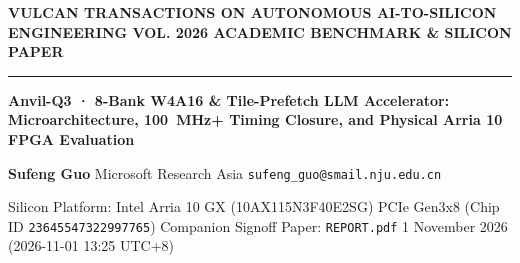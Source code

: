 \documentclass[11pt,a4paper]{article}
\begin{document}
{\scriptsize\sffamily\textcolor{vulcan}{\textbf{VULCAN TRANSACTIONS ON AUTONOMOUS AI-TO-SILICON ENGINEERING \hfill VOL. 2026 \textperiodcentered{} ACADEMIC BENCHMARK \& SILICON PAPER}}\par}

\vspace{1pt}\textcolor{vulcan}{\rule{\textwidth}{1.2pt}}\vspace{3pt}

\begin{center}

{\sffamily\LARGE\bfseries Anvil-Q3 · 8-Bank W4A16 \& Tile-Prefetch LLM Accelerator: Microarchitecture, 100~MHz+ Timing Closure, and Physical Arria 10 FPGA Evaluation\par}\vspace{3pt}

{\small\sffamily\textbf{Sufeng Guo} \textperiodcentered{} Microsoft Research Asia \textperiodcentered{} \texttt{sufeng\_guo@smail.nju.edu.cn}\par}\vspace{1pt}

{\scriptsize\sffamily\textcolor{black!75}{Silicon Platform: Intel Arria 10 GX (\allowbreak{}10AX115N3F40E2SG)\allowbreak{} PCIe Gen3x8 (Chip ID \texttt{23645547322997765}) \textperiodcentered{} Companion Signoff Paper: \texttt{REPORT.pdf} \textperiodcentered{} 1 November 2026 (\allowbreak{}2026-11-01 13:25 UTC+\allowbreak{}8)\allowbreak{}}\par}

\end{center}\vspace{2pt}
\end{document}
